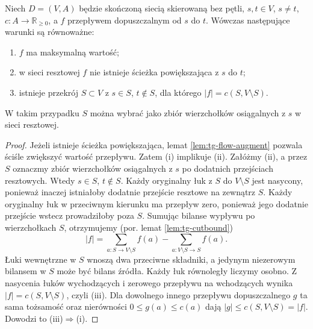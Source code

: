 \begin{twierdzenie}
\label{thm:tg-flow-certificate}
Niech $D=(V,A)$ będzie skończoną siecią skierowaną
bez pętli, $s,t\in V$, $s\ne t$, $c:A\to\mathbb R_{\geq0}$,
a $f$ przepływem dopuszczalnym od $s$ do $t$.
Wówczas następujące warunki są równoważne:
\begin{enumerate}[label=(\roman*)]
\item $f$ ma maksymalną wartość;
\item w sieci resztowej $f$ nie istnieje ścieżka
      powiększająca z $s$ do $t$;
\item istnieje przekrój $S\subset V$ z
      $s\in S$, $t\notin S$, dla którego
      $|f|=c(S,V\setminus S)$.
\end{enumerate}
W takim przypadku $S$ można wybrać jako zbiór
wierzchołków osiągalnych z $s$ w sieci resztowej.
\end{twierdzenie}
\begin{proof}
Jeżeli istnieje ścieżka powiększająca,
lemat \ref{lem:tg-flow-augment} pozwala
ściśle zwiększyć wartość przepływu. Zatem (i)
implikuje (ii). Załóżmy (ii), a przez $S$ oznaczmy
zbiór wierzchołków osiągalnych z $s$
po dodatnich przejściach resztowych.
Wtedy $s\in S$, $t\notin S$.
Każdy oryginalny łuk z $S$ do $V\setminus S$
jest nasycony, ponieważ inaczej istniałoby
dodatnie przejście resztowe na zewnątrz $S$.
Każdy oryginalny łuk w przeciwnym kierunku
ma przepływ zero, ponieważ jego dodatnie
przejście wstecz prowadziłoby poza $S$.
Sumując bilanse wypływu po wierzchołkach $S$,
otrzymujemy (por. lemat \ref{lem:tg-cutbound})
\[
|f|=\sum_{a:S\to V\setminus S}f(a)
-\sum_{a:V\setminus S\to S}f(a).
\]
Łuki wewnętrzne w $S$ wnoszą dwa przeciwne
składniki, a jedynym niezerowym bilansem w $S$
może być bilans źródła. Każdy łuk równoległy
liczymy osobno. Z nasycenia łuków wychodzących
i zerowego przepływu na wchodzących wynika
$|f|=c(S,V\setminus S)$, czyli (iii).
Dla dowolnego innego przepływu dopuszczalnego
$g$ ta sama tożsamość oraz nierówności
$0\leq g(a)\leq c(a)$ dają
$|g|\leq c(S,V\setminus S)=|f|$.
Dowodzi to (iii)$\Rightarrow$(i).
\end{proof}

